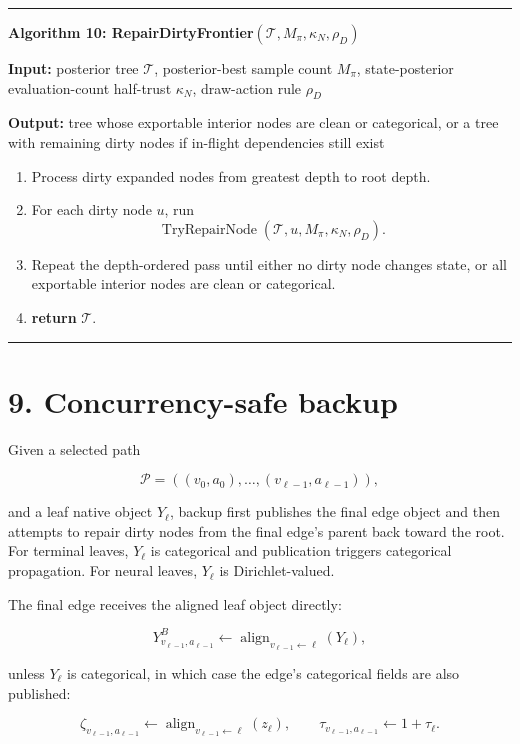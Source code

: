 \documentclass[11pt]{article}
\newcommand{\Tree}{\mathcal{T}}
\newcommand{\Path}{\mathcal{P}}
\newcommand{\Align}{\operatorname{align}}
\newcommand{\TryRepairNode}{\operatorname{TryRepairNode}}
\newenvironment{algorithmblock}[1]
{
  \par\medskip
  \noindent\hrule\par\smallskip
  \noindent\textbf{#1}
  \par\smallskip
}
{
  \par\smallskip\noindent\hrule\par\medskip
}
\newcommand{\Input}{\textbf{Input: }}
\newcommand{\Output}{\textbf{Output: }}
\newcommand{\Return}{\textbf{return }}
\begin{document}
\begin{algorithmblock}{Algorithm 10: RepairDirtyFrontier\((\Tree,M_\pi,\kappa_N,\rho_D)\)}

\Input posterior tree \(\Tree\), posterior-best sample count \(M_\pi\), state-posterior evaluation-count half-trust \(\kappa_N\), draw-action rule \(\rho_D\)

\Output tree whose exportable interior nodes are clean or categorical, or a tree with remaining dirty nodes if in-flight dependencies still exist

\begin{enumerate}[leftmargin=2em]
  \item Process dirty expanded nodes from greatest depth to root depth.

  \item For each dirty node \(u\), run
  \[
  \TryRepairNode(\Tree,u,M_\pi,\kappa_N,\rho_D).
  \]

  \item Repeat the depth-ordered pass until either no dirty node changes state,
  or all exportable interior nodes are clean or categorical.

  \item \Return \(\Tree\).
\end{enumerate}

\end{algorithmblock}

\section*{9. Concurrency-safe backup}

Given a selected path

\[
\Path=((v_0,a_0),\ldots,(v_{\ell-1},a_{\ell-1})),
\]

and a leaf native object \(Y_\ell\), backup first publishes the final edge object
and then attempts to repair dirty nodes from the final edge's parent back toward
the root. For terminal leaves, \(Y_\ell\) is categorical and publication triggers
categorical propagation. For neural leaves, \(Y_\ell\) is Dirichlet-valued.

The final edge receives the aligned leaf object directly:

\[
Y^B_{v_{\ell-1},a_{\ell-1}}
\gets
\Align_{v_{\ell-1}\leftarrow \ell}(Y_\ell),
\]

unless \(Y_\ell\) is categorical, in which case the edge's categorical fields are
also published:

\[
\zeta_{v_{\ell-1},a_{\ell-1}}
\gets
\Align_{v_{\ell-1}\leftarrow \ell}(z_\ell),
\qquad
\tau_{v_{\ell-1},a_{\ell-1}}
\gets
1+\tau_\ell.
\]
\end{document}
